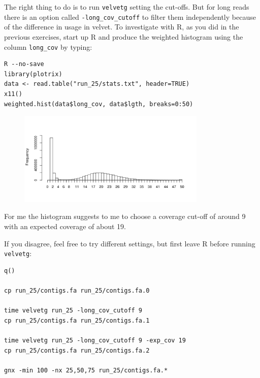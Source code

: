 \begin{steps}
The right thing to do is to run \texttt{velvetg} setting the cut-offs. But for long reads
there is an option called \texttt{-long\_cov\_cutoff} to filter them
independently because of the difference in usage in velvet. To investigate with
R, as you did in the previous exercises, start up R and produce the weighted
histogram using the column \texttt{long\_cov} by typing:
\begin{lstlisting}
R --no-save
library(plotrix) 
data <- read.table("run_25/stats.txt", header=TRUE) 
x11() 
weighted.hist(data$long_cov, data$lgth, breaks=0:50)
\end{lstlisting}

\begin{figure}[H]
\centering
\includegraphics[width=0.8\textwidth]{de_novo/velvet/velvet_Rplot003.png}
\label{fig:velvet_Rplot003}
\end{figure}

For me the histogram suggests to me to choose a coverage cut-off of around 9
with an expected coverage of about 19.

If you disagree, feel free to try different settings, but first leave R before
running \texttt{velvetg}:
\begin{lstlisting}
q()

cp run_25/contigs.fa run_25/contigs.fa.0

time velvetg run_25 -long_cov_cutoff 9
cp run_25/contigs.fa run_25/contigs.fa.1

time velvetg run_25 -long_cov_cutoff 9 -exp_cov 19
cp run_25/contigs.fa run_25/contigs.fa.2

gnx -min 100 -nx 25,50,75 run_25/contigs.fa.*
\end{lstlisting}

\end{steps}

